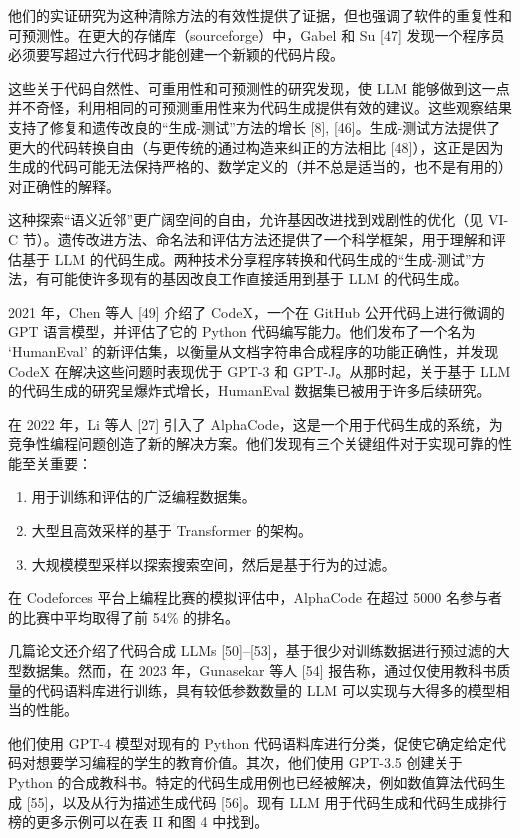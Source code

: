 \begin{translation}
他们的实证研究为这种清除方法的有效性提供了证据，但也强调了软件的重复性和可预测性。在更大的存储库（sourceforge）中，Gabel 和 Su [47] 发现一个程序员必须要写超过六行代码才能创建一个新颖的代码片段。

这些关于代码自然性、可重用性和可预测性的研究发现，使 LLM 能够做到这一点并不奇怪，利用相同的可预测重用性来为代码生成提供有效的建议。这些观察结果支持了修复和遗传改良的“生成-测试”方法的增长 [8], [46]。生成-测试方法提供了更大的代码转换自由（与更传统的通过构造来纠正的方法相比 [48]），这正是因为生成的代码可能无法保持严格的、数学定义的（并不总是适当的，也不是有用的）对正确性的解释。

这种探索“语义近邻”更广阔空间的自由，允许基因改进找到戏剧性的优化（见 VI-C 节）。遗传改进方法、命名法和评估方法还提供了一个科学框架，用于理解和评估基于 LLM 的代码生成。两种技术分享程序转换和代码生成的“生成-测试”方法，有可能使许多现有的基因改良工作直接适用到基于 LLM 的代码生成。

2021 年，Chen 等人 [49] 介绍了 CodeX，一个在 GitHub 公开代码上进行微调的 GPT 语言模型，并评估了它的 Python 代码编写能力。他们发布了一个名为 ‘HumanEval’ 的新评估集，以衡量从文档字符串合成程序的功能正确性，并发现 CodeX 在解决这些问题时表现优于 GPT-3 和 GPT-J。从那时起，关于基于 LLM 的代码生成的研究呈爆炸式增长，HumanEval 数据集已被用于许多后续研究。

在 2022 年，Li 等人 [27] 引入了 AlphaCode，这是一个用于代码生成的系统，为竞争性编程问题创造了新的解决方案。他们发现有三个关键组件对于实现可靠的性能至关重要：
\begin{enumerate}
    \item 用于训练和评估的广泛编程数据集。
    \item 大型且高效采样的基于 Transformer 的架构。
    \item 大规模模型采样以探索搜索空间，然后是基于行为的过滤。
\end{enumerate}

在 Codeforces 平台上编程比赛的模拟评估中，AlphaCode 在超过 5000 名参与者的比赛中平均取得了前 54\% 的排名。

几篇论文还介绍了代码合成 LLMs [50]–[53]，基于很少对训练数据进行预过滤的大型数据集。然而，在 2023 年，Gunasekar 等人 [54] 报告称，通过仅使用教科书质量的代码语料库进行训练，具有较低参数数量的 LLM 可以实现与大得多的模型相当的性能。

他们使用 GPT-4 模型对现有的 Python 代码语料库进行分类，促使它确定给定代码对想要学习编程的学生的教育价值。其次，他们使用 GPT-3.5 创建关于 Python 的合成教科书。特定的代码生成用例也已经被解决，例如数值算法代码生成 [55]，以及从行为描述生成代码 [56]。现有 LLM 用于代码生成和代码生成排行榜的更多示例可以在表 II 和图 4 中找到。

\end{translation}
